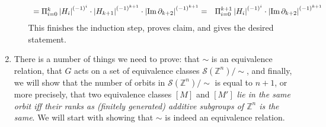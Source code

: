 \documentclass[8pt,fleqn]{article} %
\begin{document}
\begin{enumerate}[label=\bfseries Problem \arabic*.]
\begin{enumerate}[label=(\arabic*).]
\[\begin{array}{rr}
		=\Pi_{i=0}^k\left|H_i\right|^{(-1)^i}\cdot\left|H_{k+1}\right|^{(-1)^{k+1}}\cdot\left|\operatorname{Im}\partial_{k+2}\right|^{(-1)^{k+1}}=
		&\Pi_{i=0}^{k+1}\left|H_i\right|^{(-1)^i}\cdot\left|\operatorname{Im}\partial_{k+2}\right|^{(-1)^{k+1}}\end{array}\]
		This finishes the induction step, proves claim, and gives the desired statement.
		\end{enumerate}
	\item \newcommand{\orbs}{\mathcal{S}(\mathbb{Z}^n)/\sim}
		\newcommand{\rk}{\mbox{rk }}
		There is a number of things we need to prove: that $\sim$ is an equivalence relation, that $G$ acts 
		on a set of equivalence classes $\mathcal{S}(\mathbb{Z}^n)/\sim$, and finally, we will show that the number of orbits
		in $\orbs$ is equal to $n+1$, or more precisely, that two equivalence classes $[M]$ and $[M']$ {\it lie in the same orbit iff
		their ranks as (finitely generated)
		additive subgroups of $\mathbb{Z}^n$ is the same}. We will start with showing that $\sim$ is indeed an equivalence relation.


\end{enumerate}
\end{document}
